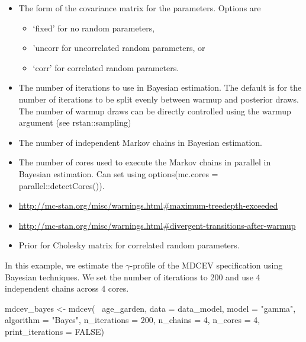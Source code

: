 \begin{itemize}
\item
   The form of the covariance matrix for the
  parameters. Options are

  \begin{itemize}
  \tightlist
  \item
    `fixed' for no random parameters,
  \item
    'uncorr for uncorrelated random parameters, or
  \item
    `corr' for correlated random parameters.
  \end{itemize}
\item
   The number of iterations to use in Bayesian
  estimation. The default is for the number of iterations to be split
  evenly between warmup and posterior draws. The number of warmup draws
  can be directly controlled using the warmup argument (see
  rstan::sampling)
\item
   The number of independent Markov chains in Bayesian
  estimation.
\item
   The number of cores used to execute the Markov chains
  in parallel in Bayesian estimation. Can set using options(mc.cores =
  parallel::detectCores()).
\item
  \url{http://mc-stan.org/misc/warnings.html\#maximum-treedepth-exceeded}
\item
  \url{http://mc-stan.org/misc/warnings.html\#divergent-transitions-after-warmup}
\item
   Prior for Cholesky matrix for correlated
  random parameters.
\end{itemize}

In this example, we estimate the \(\gamma\)-profile of the MDCEV
specification using Bayesian techniques. We set the number of iterations
to 200 and use 4 independent chains across 4 cores.

\begin{Schunk}
\begin{Sinput}
mdcev_bayes <- mdcev(~ age_garden,
                        data = data_model,
                        model = "gamma",
                        algorithm = "Bayes",
                        n_iterations = 200,
                        n_chains = 4,
                        n_cores = 4,
                        print_iterations = FALSE)
\end{Sinput}
\end{Schunk}

